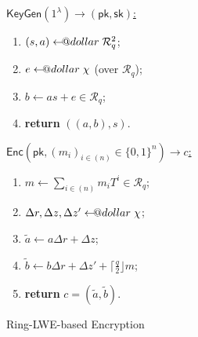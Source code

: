 \documentclass{template}
\makeatletter
\newcommand\leftarrowS{\leftarrow\joinrel\smalldollar}
\newcommand{\smalldollar}{\mathrel{\mathpalette\small@dollar\relax}}
\newcommand{\small@dollar}[2]{%
  \vcenter{\hbox{%
    $#1\textnormal{\fontsize{0.7\dimexpr\f@size pt}{0}\selectfont\$}$%
  }}%
}
\makeatother
\begin{document}
\begin{figure}[ht]
\centering
\footnotesize 

\begin{minipage}[t]{0.32\linewidth}
    \begin{mdframed}[linecolor=black, linewidth=1.0pt,
                     skipabove=5pt, skipbelow=5pt,
                     innerleftmargin=5pt, innerrightmargin=5pt]
        \centering
        \colorbox{purple!10}{\underline{$\mathsf{KeyGen}(1^{\lambda}) \to (\mathsf{pk},\mathsf{sk})$:}}
        \begin{enumerate}
            \item $(s,a) \leftarrowS \mathcal{R}_q^2$;
            \item $e \leftarrowS \chi$ (over $\mathcal{R}_q$);
            \item $b \gets as + e \in \mathcal{R}_q$;
            \item \textbf{return} $((a,b),s)$.
        \end{enumerate}
    \end{mdframed}
    \caption{Ring-LWE-based Key Generation}
    \label{fig:ring-keygen}
\end{minipage}
\hfill
\begin{minipage}[t]{0.32\linewidth}
    \begin{mdframed}[linecolor=black, linewidth=1.0pt,
                     skipabove=5pt, skipbelow=5pt,
                     innerleftmargin=5pt, innerrightmargin=5pt]
        \centering
        \colorbox{green!10}{\underline{$\mathsf{Enc}(\mathsf{pk}, (m_i)_{i \in (n)} \in \{0,1\}^n) \to c$:}}
        \begin{enumerate}
            \item $m \gets \sum_{i \in (n)}m_iT^i \in \mathcal{R}_q$;
            \item $\Delta r, \Delta z, \Delta z' \leftarrowS \chi$;
            \item $\widetilde{a} \gets a\Delta r + \Delta z$;
            \item $\widetilde{b} \gets b\Delta r  + \Delta z' + \lceil \frac{q}{2} \rfloor m$;
            \item \textbf{return} $c=(\widetilde{a}, \widetilde{b})$.
        \end{enumerate}
    \end{mdframed}
    \caption{Ring-LWE-based Encryption} 
    \label{fig:ring-lwe-enc}
\end{minipage}
\hfill
\begin{minipage}[t]{0.32\linewidth}

\end{minipage}
\end{figure}
\end{document}
